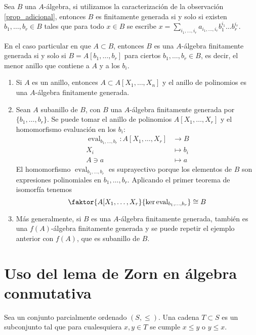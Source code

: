 \documentclass[./main.tex]{subfiles}
\begin{document}
\begin{remark}
Sea $B$ una $A$-álgebra, si utilizamos la caracterización de la observación \ref{prop_adicional}, entonces $B$ es finitamente generada si y solo si existen $b_1,\dots, b_r \in B$ tales que para todo $x \in B$ se escribe $x = \sum _{i_1, \dots, i_r} a_{i_1,\dots,i_r} b_1^{i_1}\dots b_r^{i_r}$.

En el caso particular en que $A\subset B$, entonces $B$ es una $A$-álgebra finitamente generada si y solo si $B = A[b_1, \dots, b_r]$ para ciertos $b_1,\dots, b_r \in B$, es decir, el menor anillo que contiene a $A$ y a los $b_i$.
\end{remark}
\begin{example}
\begin{enumerate}
    \item Si $A$ es un anillo, entonces $A\subset A[X_1, \dots, X_n]$ y el anillo de polinomios es una $A$-álgebra finitamente generada.
    \item Sean $A$ subanillo de $B$, con $B$ una $A$-álgebra finitamente generada por $\{b_1,\dots,b_r\}$. Se puede tomar el anillo de polinomios $A[X_1,\dots,X_r]$ y el homomorfismo evaluación en los $b_i$:
    \begin{align*}
        \operatorname{eval}_{b_1,\dots, b_r}:A[X_1,\dots,X_r] &\to B\\
        X_i &\mapsto b_i\\
        A \ni a &\mapsto a
    \end{align*}
    El homomorfismo $\operatorname{eval}_{b_1,\dots, b_r}$ es suprayectivo porque los elementos de $B$ son expresiones polinomiales en $b_1,\dots, b_r$. Aplicando el primer teorema de isomorfía tenemos
    \[\faktor{A[X_1,\dots,X_r}{\ker \operatorname{eval}_{b_1,\dots, b_r}} \cong B\]
    \item Más generalmente, si $B$ es una $A$-álgebra finitamente generada, también es una $f(A)$-álgebra finitamente generada y se puede repetir el ejemplo anterior con $f(A)$, que es subanillo de $B$.
\end{enumerate}

\end{example}

\section{Uso del lema de Zorn en álgebra conmutativa}

\begin{definition}
  Sea un conjunto parcialmente ordenado $(S,\leq)$. Una cadena $T \subset S$ es un subconjunto tal que para cualesquiera $x,y \in T$ se cumple $x\leq y$ o $ y \leq x$.
\end{definition}
\end{document}
